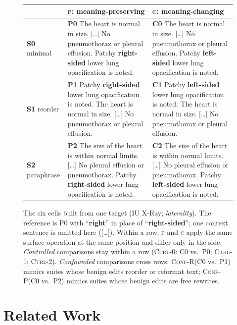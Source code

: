 \documentclass[11pt]{article}
\newcommand{\Pc}{\textsc{p}\xspace}
\newcommand{\Cc}{\textsc{c}\xspace}
\newcommand{\ctrlz}{\textsc{Ctrl-0}\xspace}
\newcommand{\ctrlo}{\textsc{Ctrl-1}\xspace}
\newcommand{\ctrlt}{\textsc{Ctrl-2}\xspace}
\newcommand{\confr}{\textsc{Conf-R}\xspace}
\newcommand{\confp}{\textsc{Conf-P}\xspace}
\newcommand{\chg}[1]{\textbf{#1}}
\begin{document}
\begin{figure}[t]
\centering
\small
\setlength{\tabcolsep}{4pt}
\begin{tabular}{p{}p{}p{}}
\toprule
 & \textbf{\Pc: meaning-preserving} & \textbf{\Cc: meaning-changing} \\
\midrule
\textbf{S0} minimal &
\textbf{P0}\; The heart is normal in size. [\dots] No pneumothorax or pleural effusion. Patchy \chg{right-sided} lower lung opacification is noted. &
\textbf{C0}\; The heart is normal in size. [\dots] No pneumothorax or pleural effusion. Patchy \chg{left-sided} lower lung opacification is noted. \\
\addlinespace
\textbf{S1} reorder &
\textbf{P1}\; Patchy \chg{right-sided} lower lung opacification is noted. The heart is normal in size. [\dots] No pneumothorax or pleural effusion. &
\textbf{C1}\; Patchy \chg{left-sided} lower lung opacification is noted. The heart is normal in size. [\dots] No pneumothorax or pleural effusion. \\
\addlinespace
\textbf{S2} paraphrase &
\textbf{P2}\; The size of the heart is within normal limits. [\dots] No pleural effusion or pneumothorax. Patchy \chg{right-sided} lower lung opacification is noted. &
\textbf{C2}\; The size of the heart is within normal limits. [\dots] No pleural effusion or pneumothorax. Patchy \chg{left-sided} lower lung opacification is noted. \\
\bottomrule
\end{tabular}
\caption{The six cells built from one target (IU X-Ray; \emph{laterality}). The reference is P0 with ``\chg{right}'' in place of ``\chg{right-sided}''; one context sentence is omitted here ([\dots]). Within a row, \Pc and \Cc apply the same surface operation at the same position and differ only in the side. \emph{Controlled} comparisons stay within a row (\ctrlz: C0 vs.\ P0; \ctrlo; \ctrlt). \emph{Confounded} comparisons cross rows: \confr (C0 vs.\ P1) mimics suites whose benign edits reorder or reformat text; \confp (C0 vs.\ P2) mimics suites whose benign edits are free rewrites.}
\label{fig:design}
\end{figure}

\section{Related Work}
\end{document}
